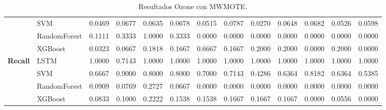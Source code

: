 \begin{table}[h]
\begin{adjustbox}{max width=15cm}
\begin{tabular}{|c|l|r|r|r|r|r|r|r|r|r|r|r|}
			& SVM &  0.0469 &  0.0677 &  0.0635 &  0.0678 &  0.0515 &  0.0787 &  0.0270 &  0.0648 &  0.0682 &  0.0526 &  0.0598 \\
			& RandomForest &  0.1111 &  0.3333 &  1.0000 &  0.3333 &  0.0000 &  0.0000 &  0.0000 &  0.0000 &  0.0000 &  0.0000 &  0.0000 \\
			& XGBoost &  0.0323 &  0.0667 &  0.1818 &  0.1667 &  0.6667 &  0.1667 &  0.2000 &  0.2000 &  0.0000 &  0.2000 &  0.0000 \\
			\hline
			\textbf{Recall} & LSTM &  1.0000 &  0.7143 &  1.0000 &  1.0000 &  1.0000 &  1.0000 &  1.0000 &  1.0000 &  1.0000 &  1.0000 &  1.0000 \\
			& SVM &  0.6667 &  0.9000 &  0.8000 &  0.8000 &  0.7000 &  0.7143 &  0.4286 &  0.6364 &  0.8182 &  0.6364 &  0.5385 \\
			& RandomForest &  0.0909 &  0.0769 &  0.2727 &  0.0667 &  0.0000 &  0.0000 &  0.0000 &  0.0000 &  0.0000 &  0.0000 &  0.0000 \\
			& XGBoost &  0.0833 &  0.1000 &  0.2222 &  0.1538 &  0.1538 &  0.1667 &  0.1667 &  0.1667 &  0.0000 &  0.0556 &  0.0000 \\
			\hline
		\end{tabular}
	\end{adjustbox}
	\caption{Resultados Ozone con MWMOTE.}
	\label{tab:Ozone_MWMOTE}
\end{table}
\newpage

